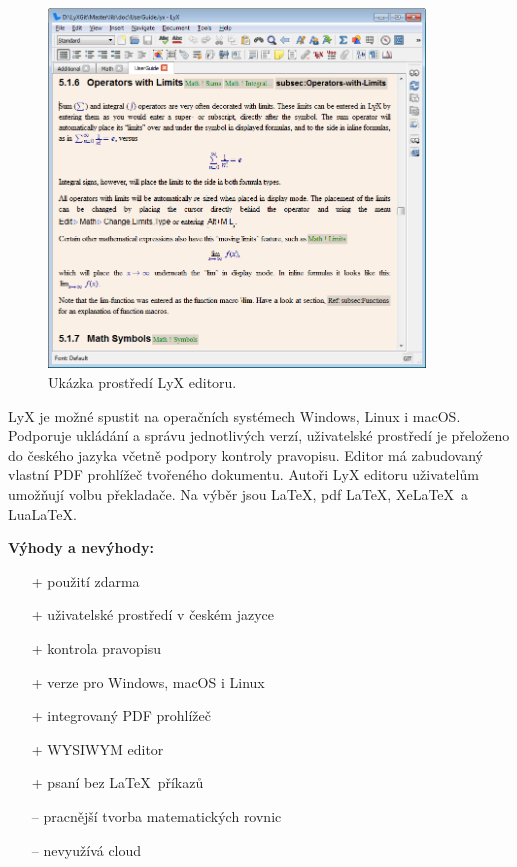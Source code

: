 \begin{figure}[h]
	\centering
	\includegraphics[width=10cm]{obrázky/lyx.png}
	\caption[Ukázka prostředí LyX editoru.]{Ukázka prostředí LyX editoru. \cite{Lyximg}}
	\label{fig:lyx}
\end{figure}

LyX je možné spustit na operačních systémech Windows, Linux i macOS. Podporuje ukládání a správu jednotlivých verzí, uživatelské prostředí je přeloženo do českého jazyka včetně podpory kontroly pravopisu. Editor má zabudovaný vlastní PDF prohlížeč tvořeného dokumentu. Autoři LyX editoru uživatelům umožňují volbu překladače. Na výběr jsou \LaTeX, pdf \LaTeX, Xe\LaTeX\ a Lua\LaTeX. \cite{Lyxfeatures}

\textbf{Výhody a nevýhody:}
\begin{multicols}{2}
	\begin{itemize}
		\item [+] použití zdarma
		\item [+] uživatelské prostředí v českém jazyce
		\item [+] kontrola pravopisu
		\item [+] verze pro Windows, macOS i Linux
		\item [+] integrovaný PDF prohlížeč
		\item [+] WYSIWYM editor
		\item [+] psaní bez \LaTeX\ příkazů
	\columnbreak
		\item [--] pracnější tvorba matematických rovnic
		\item [--] nevyužívá cloud
	\end{itemize}
\end{multicols}

